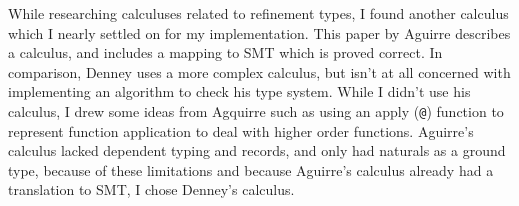 While researching calculuses related to refinement types, I found another calculus which I nearly
settled on for my implementation.
This paper by Aguirre \cite{aguirre16} describes a calculus, and includes a mapping to SMT which
is proved correct.
In comparison, Denney uses a more complex calculus, but isn't at all concerned with implementing
an algorithm to check his type system.
While I didn't use his calculus, I drew some ideas from Agquirre such as using an apply (\texttt{@})
function to represent function application to deal with higher order functions.
Aguirre's calculus lacked dependent typing and records, and only had naturals as a ground type,
because of these limitations and because Aguirre's calculus already had a translation to SMT, I
chose Denney's calculus.
